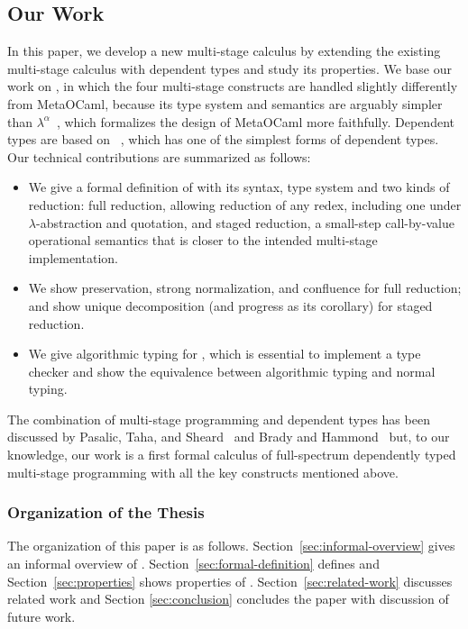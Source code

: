 \subsection{Our Work}
In this paper, we develop a new multi-stage calculus \LMD by extending the
existing multi-stage calculus \LTP\cite{HanadaIgarashi2014CSP} with dependent types and
study its properties.  We base our work on \LTP, in which the four multi-stage
constructs are handled slightly differently from MetaOCaml, because its type
system and semantics are arguably simpler than
\(\lambda^\alpha\)~\cite{TahaNielsen2003Environment}, which formalizes the design of
MetaOCaml more faithfully.  Dependent types are based on \LLF~\cite{attapl},
which has one of the simplest forms of dependent types.  Our technical
contributions are summarized as follows:
\begin{itemize}
    \item We give a formal definition of \LMD with its syntax, type system and
        two kinds of reduction: full reduction, allowing reduction of any redex,
        including one under $\lambda$-abstraction and quotation, and staged reduction, a
        small-step call-by-value operational semantics that is closer to the intended
        multi-stage implementation.
    \item We show preservation, strong normalization, and confluence for full
        reduction; and show unique decomposition (and progress as its
        corollary) for staged reduction.
    \item We give algorithmic typing for \LMD, which is essential to implement
        a type checker and show the equivalence between algorithmic typing and
        normal typing.
\end{itemize}
The combination of multi-stage programming and dependent types has been
discussed by Pasalic, Taha, and Sheard~\cite{PasalicTahaSheard2002Tagless} and Brady and
Hammond~\cite{BradyHammond2006Dependently} but, to our knowledge, our work is a first
formal calculus of full-spectrum dependently typed multi-stage programming with
all the key constructs mentioned above.

\subsubsection{Organization of the Thesis}

The organization of this paper is as follows.
Section~\ref{sec:informal-overview} gives an informal overview of
\LMD. Section~\ref{sec:formal-definition} defines \LMD and
Section~\ref{sec:properties} shows properties of \LMD.
Section~\ref{sec:related-work} discusses related work and Section
\ref{sec:conclusion} concludes the paper with discussion of future
work.

